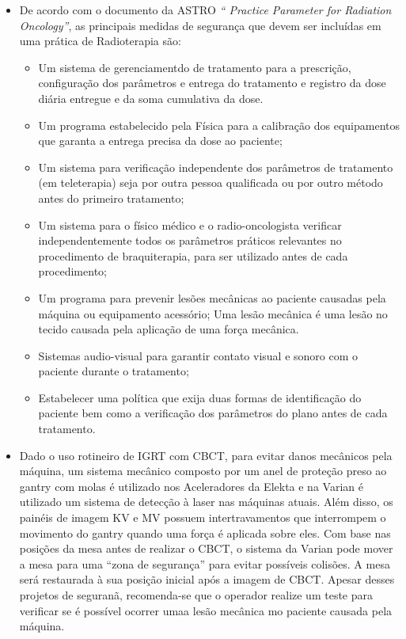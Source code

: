 \documentclass[11pt,a4paper]{article}
\newcounter{exemplo}
\begin{document}
\begin{exemplo}[11. Qualidade ]
\begin{itemize}
        \item De acordo com o documento da ASTRO \textit{`` Practice Parameter for Radiation Oncology''}, as principais medidas de segurança que devem ser incluídas em uma prática de Radioterapia são:
            \begin{itemize}[label=\textcolor{CarnationPink}{$\star$}]
                \item Um sistema de gerenciamentdo de tratamento para a prescrição, configuração dos parâmetros e entrega do tratamento e registro da dose diária entregue e da soma cumulativa da dose.
                \item Um programa estabelecido pela Física para a calibração dos equipamentos que garanta a entrega precisa da dose ao paciente;
                \item Um sistema para verificação independente dos parâmetros de tratamento (em teleterapia) seja por outra pessoa qualificada ou por outro método antes do primeiro tratamento;
                \item Um sistema para o físico médico e o radio-oncologista verificar independentemente todos os parâmetros práticos relevantes no procedimento de braquiterapia, para ser utilizado antes de cada procedimento;
                \item Um programa para prevenir lesões mecânicas ao paciente causadas pela máquina ou equipamento acessório; Uma lesão mecânica é uma lesão no tecido causada pela aplicação de uma força mecânica.
                \item Sistemas audio-visual para garantir contato visual e sonoro com o paciente durante o tratamento;
                \item Estabelecer uma política que exija duas formas de identificação do paciente bem como a verificação dos parâmetros do plano antes de cada tratamento. 
            \end{itemize}
        
        \item Dado o uso rotineiro de IGRT com CBCT, para evitar danos mecânicos pela máquina, um sistema mecânico composto por um anel de proteção preso ao gantry com molas é utilizado nos Aceleradores da Elekta e na Varian é utilizado um sistema de detecção à laser nas máquinas atuais. Além disso, os painéis de imagem KV e MV possuem intertravamentos que interrompem o movimento do gantry quando uma força é aplicada sobre eles. Com base nas posições da mesa antes de realizar o CBCT, o sistema da Varian pode mover a mesa para uma ``zona de segurança'' para evitar possíveis colisões. A mesa será restaurada à sua posição inicial após a imagem de CBCT. Apesar desses projetos de seguranã, recomenda-se que o operador realize um teste para verificar se é possível ocorrer umaa lesão mecânica mo paciente causada pela máquina. 
        

\end{itemize}
\end{exemplo}
\end{document}
